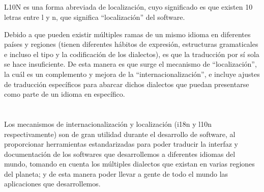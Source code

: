 \documentclass[10pt,a4paper]{article} %
\begin{document}
\subsection{\color{colorESCOM}{L10n}}
{\large L10N es una forma abreviada de localizaci{\' o}n, cuyo significado es que existen 10 letras entre l y n, que significa ``localizaci{\' o}n'' del software.


\vspace{0.5cm}
Debido a que pueden existir m{\' u}ltiples ramas de un mismo idioma en diferentes pa{\' i}ses y regiones (tienen diferentes h{\' a}bitos de expresi{\' o}n, estructuras gramaticales e incluso el tipo y la codificaci{\' o}n de los dialectos), es que la traducci{\' o}n por s{\' i} sola se hace insuficiente. De esta manera es que surge el mecanismo de ``localizaci{\' o}n'', la cu{\' a}l es un complemento y mejora de la ``internacionalizaci{\' o}n'', e incluye ajustes de traducci{\' o}n espec{\' i}ficos para abarcar dichos dialectos que puedan presentarse como parte de un idioma en espec{\' i}fico.}

\pagebreak

\section{}
{\large Los mecanismos de internacionalizaci{\' o}n y localizaci{\' o}n (i18n y l10n respectivamente) son de gran utilidad durante el desarrollo de software, al proporcionar herramientas estandarizadas para poder traducir la interfaz y documentaci{\' o}n de los softwares que desarrollemos a diferentes idiomas del mundo, tomando en cuenta los m{\' u}ltiples dialectos que existan en varias regiones del planeta; y de esta manera poder llevar a gente de todo el mundo las aplicaciones que desarrollemos.}


\pagebreak

\end{document}
